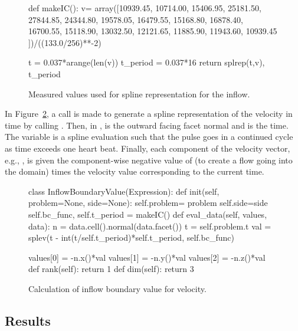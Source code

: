 \begin{figure}
  \codesize
  \begin{center}
    \begin{python}
def makeIC():
    v= array([10939.45, 10714.00, 15406.95, 25181.50, 27844.85,
	      24344.80, 19578.05, 16479.55, 15168.80, 16878.40,
	      16700.55, 15118.90, 13032.50, 12121.65, 11885.90,
	      11943.60, 10939.45 ])/((133.0/256)**-2)

    t = 0.037*arange(len(v))
    t_period = 0.037*16
    return splrep(t,v), t_period
    \end{python}
    \caption{Measured values used for spline representation for the inflow.}
    \label{fig:inflow_codeI}
  \end{center}
\end{figure}

In Figure~\ref{fig:inflow_codeII}, a call is made to generate a spline
representation of the velocity in time by calling .
Then, in ,  is the outward facing facet normal
and  is the time. The variable  is a spline evaluation
such that the pulse goes in a continued cycle as time exceeds one
heart beat. Finally, each component of the velocity vector, e.g.,
, is given the component-wise negative value of 
(to create a flow going into the domain) times the velocity value
corresponding to the current time.

\begin{figure}
  \codesize
  \begin{center}
    \begin{python}
class InflowBoundaryValue(Expression):
    def init(self, problem=None, side=None):
        self.problem= problem
        self.side=side
        self.bc_func, self.t_period = makeIC()
    def eval_data(self, values, data):
        n = data.cell().normal(data.facet())
        t = self.problem.t
        val =  splev(t - int(t/self.t_period)*self.t_period, self.bc_func)

        values[0] = -n.x()*val
        values[1] = -n.y()*val
        values[2] = -n.z()*val
    def rank(self):
        return 1
    def dim(self):
        return 3
    \end{python}
    \caption{Calculation of inflow boundary value for velocity.}
    \label{fig:inflow_codeII}
  \end{center}
\end{figure}

\subsection{Results}

